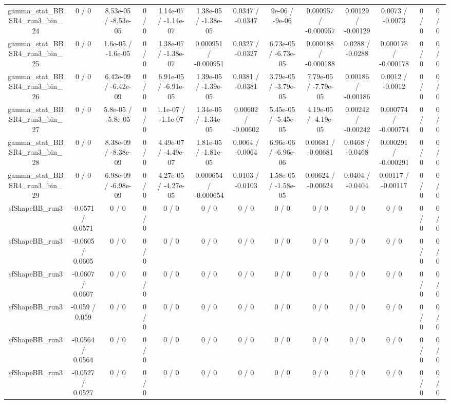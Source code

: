 \documentclass[10pt]{article}
\begin{document}
\begin{table}[htbp]
\begin{center}
\begin{tabular}{|c|c|c|c|c|c|c|c|c|c|c|c|c|}
  gamma_stat_BBSR4_run3_bin_24 & 0 / 0 & 8.53e-05 / -8.53e-05 & 0 / 0 & 1.14e-07 / -1.14e-07 & 1.38e-05 / -1.38e-05 & 0.0347 / -0.0347 & 9e-06 / -9e-06 & 0.000957 / -0.000957 & 0.00129 / -0.00129 & 0.0073 / -0.0073 & 0 / 0 & 0 / 0 \\ 
  gamma_stat_BBSR4_run3_bin_25 & 0 / 0 & 1.6e-05 / -1.6e-05 & 0 / 0 & 1.38e-07 / -1.38e-07 & 0.000951 / -0.000951 & 0.0327 / -0.0327 & 6.73e-05 / -6.73e-05 & 0.000188 / -0.000188 & 0.0288 / -0.0288 & 0.000178 / -0.000178 & 0 / 0 & 0 / 0 \\ 
  gamma_stat_BBSR4_run3_bin_26 & 0 / 0 & 6.42e-09 / -6.42e-09 & 0 / 0 & 6.91e-05 / -6.91e-05 & 1.39e-05 / -1.39e-05 & 0.0381 / -0.0381 & 3.79e-05 / -3.79e-05 & 7.79e-05 / -7.79e-05 & 0.00186 / -0.00186 & 0.0012 / -0.0012 & 0 / 0 & 0 / 0 \\ 
  gamma_stat_BBSR4_run3_bin_27 & 0 / 0 & 5.8e-05 / -5.8e-05 & 0 / 0 & 1.1e-07 / -1.1e-07 & 1.34e-05 / -1.34e-05 & 0.00602 / -0.00602 & 5.45e-05 / -5.45e-05 & 4.19e-05 / -4.19e-05 & 0.00242 / -0.00242 & 0.000774 / -0.000774 & 0 / 0 & 0 / 0 \\ 
  gamma_stat_BBSR4_run3_bin_28 & 0 / 0 & 8.38e-09 / -8.38e-09 & 0 / 0 & 4.49e-07 / -4.49e-07 & 1.81e-05 / -1.81e-05 & 0.0064 / -0.0064 & 6.96e-06 / -6.96e-06 & 0.00681 / -0.00681 & 0.0468 / -0.0468 & 0.000291 / -0.000291 & 0 / 0 & 0 / 0 \\ 
  gamma_stat_BBSR4_run3_bin_29 & 0 / 0 & 6.98e-09 / -6.98e-09 & 0 / 0 & 4.27e-05 / -4.27e-05 & 0.000654 / -0.000654 & 0.0103 / -0.0103 & 1.58e-05 / -1.58e-05 & 0.00624 / -0.00624 & 0.0404 / -0.0404 & 0.00117 / -0.00117 & 0 / 0 & 0 / 0 \\ 
  sfShapeBB_run3 & -0.0571 / 0.0571 & 0 / 0 & 0 / 0 & 0 / 0 & 0 / 0 & 0 / 0 & 0 / 0 & 0 / 0 & 0 / 0 & 0 / 0 & 0 / 0 & 0 / 0 \\ 
  sfShapeBB_run3 & -0.0605 / 0.0605 & 0 / 0 & 0 / 0 & 0 / 0 & 0 / 0 & 0 / 0 & 0 / 0 & 0 / 0 & 0 / 0 & 0 / 0 & 0 / 0 & 0 / 0 \\ 
  sfShapeBB_run3 & -0.0607 / 0.0607 & 0 / 0 & 0 / 0 & 0 / 0 & 0 / 0 & 0 / 0 & 0 / 0 & 0 / 0 & 0 / 0 & 0 / 0 & 0 / 0 & 0 / 0 \\ 
  sfShapeBB_run3 & -0.059 / 0.059 & 0 / 0 & 0 / 0 & 0 / 0 & 0 / 0 & 0 / 0 & 0 / 0 & 0 / 0 & 0 / 0 & 0 / 0 & 0 / 0 & 0 / 0 \\ 
  sfShapeBB_run3 & -0.0564 / 0.0564 & 0 / 0 & 0 / 0 & 0 / 0 & 0 / 0 & 0 / 0 & 0 / 0 & 0 / 0 & 0 / 0 & 0 / 0 & 0 / 0 & 0 / 0 \\ 
  sfShapeBB_run3 & -0.0527 / 0.0527 & 0 / 0 & 0 / 0 & 0 / 0 & 0 / 0 & 0 / 0 & 0 / 0 & 0 / 0 & 0 / 0 & 0 / 0 & 0 / 0 & 0 / 0 \\ 

\end{tabular}
\end{center}
\end{table}
\end{document}
